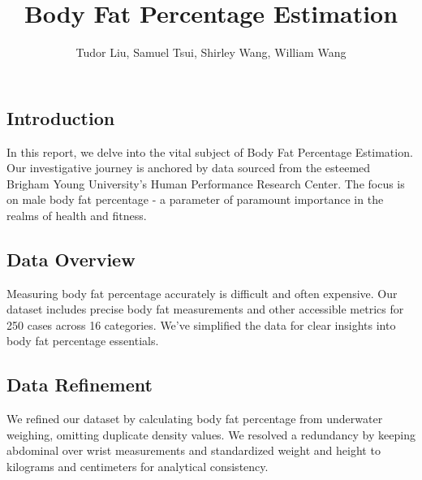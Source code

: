 \documentclass[letterpaper,9pt,twocolumn,twoside,]{pinp}
\title{Body Fat Percentage Estimation}
\author[]{Tudor Liu, Samuel Tsui, Shirley Wang, William Wang}
\begin{document}
\verticaladjustment{-2pt}

\maketitle
\thispagestyle{firststyle}



\hypertarget{introduction}{%
\subsection{Introduction}\label{introduction}}

In this report, we delve into the vital subject of Body Fat Percentage
Estimation. Our investigative journey is anchored by data sourced from
the esteemed Brigham Young University's Human Performance Research
Center. The focus is on male body fat percentage - a parameter of
paramount importance in the realms of health and fitness.

\hypertarget{data-overview}{%
\subsection{Data Overview}\label{data-overview}}

Measuring body fat percentage accurately is difficult and often
expensive. Our dataset includes precise body fat measurements and other
accessible metrics for 250 cases across 16 categories. We've simplified
the data for clear insights into body fat percentage essentials.

\hypertarget{data-refinement}{%
\subsection{Data Refinement}\label{data-refinement}}

We refined our dataset by calculating body fat percentage from
underwater weighing, omitting duplicate density values. We resolved a
redundancy by keeping abdominal over wrist measurements and standardized
weight and height to kilograms and centimeters for analytical
consistency.
\end{document}
